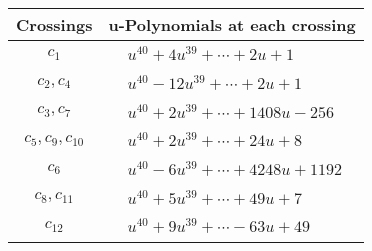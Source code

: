 \documentclass[1p]{elsarticle_modified}
\theoremstyle{definition}
\begin{document}
\begin{tabular}{m{50pt}|m{274pt}}
Crossings & \hspace{64pt}u-Polynomials at each crossing \\
\hline $$\begin{aligned}c_{1}\end{aligned}$$&$\begin{aligned}
&u^{40}+4 u^{39}+\cdots+2 u+1
\end{aligned}$\\
\hline $$\begin{aligned}c_{2},c_{4}\end{aligned}$$&$\begin{aligned}
&u^{40}-12 u^{39}+\cdots+2 u+1
\end{aligned}$\\
\hline $$\begin{aligned}c_{3},c_{7}\end{aligned}$$&$\begin{aligned}
&u^{40}+2 u^{39}+\cdots+1408 u-256
\end{aligned}$\\
\hline $$\begin{aligned}c_{5},c_{9},c_{10}\end{aligned}$$&$\begin{aligned}
&u^{40}+2 u^{39}+\cdots+24 u+8
\end{aligned}$\\
\hline $$\begin{aligned}c_{6}\end{aligned}$$&$\begin{aligned}
&u^{40}-6 u^{39}+\cdots+4248 u+1192
\end{aligned}$\\
\hline $$\begin{aligned}c_{8},c_{11}\end{aligned}$$&$\begin{aligned}
&u^{40}+5 u^{39}+\cdots+49 u+7
\end{aligned}$\\
\hline $$\begin{aligned}c_{12}\end{aligned}$$&$\begin{aligned}
&u^{40}+9 u^{39}+\cdots-63 u+49
\end{aligned}$\\
\hline
\end{tabular}\\~\\
\newpage\renewcommand{\arraystretch}{1}
\end{document}
